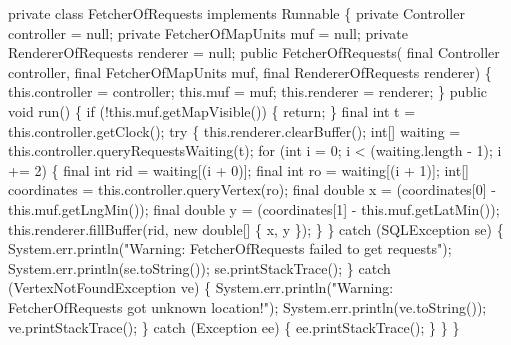 \nwenddocs{}\plusendmoddef
private class FetcherOfRequests implements Runnable \{
  private Controller controller = null;
  private FetcherOfMapUnits muf = null;
  private RendererOfRequests renderer = null;
  public FetcherOfRequests(
      final Controller controller,
      final FetcherOfMapUnits muf,
      final RendererOfRequests renderer) \{
    this.controller = controller;
    this.muf = muf;
    this.renderer = renderer;
  \}
  public void run() \{
    if (!this.muf.getMapVisible()) \{
      return;
    \}
    final int t = this.controller.getClock();
    try \{
      this.renderer.clearBuffer();
      int[] waiting = this.controller.queryRequestsWaiting(t);
      for (int i = 0; i < (waiting.length - 1); i += 2) \{
        final int rid = waiting[(i + 0)];
        final int  ro = waiting[(i + 1)];
        int[] coordinates = this.controller.queryVertex(ro);
        final double x = (coordinates[0] - this.muf.getLngMin());
        final double y = (coordinates[1] - this.muf.getLatMin());
        this.renderer.fillBuffer(rid, new double[] \{ x, y \});
      \}
    \} catch (SQLException se) \{
      System.err.println("Warning: FetcherOfRequests failed to get requests");
      System.err.println(se.toString());
      se.printStackTrace();
    \} catch (VertexNotFoundException ve) \{
      System.err.println("Warning: FetcherOfRequests got unknown location!");
      System.err.println(ve.toString());
      ve.printStackTrace();
    \} catch (Exception ee) \{
      ee.printStackTrace();
    \}
  \}
\}
\nwendcode{}\nwdocspar


